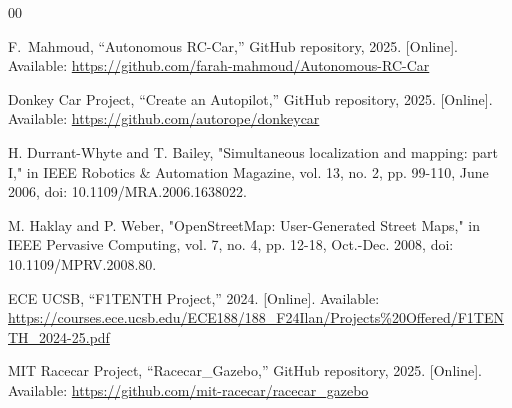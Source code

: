 \documentclass[journal,transmag]{IEEEtran}
\begin{document}
\begin{thebibliography}{00}

F.~Mahmoud, ``Autonomous RC-Car,'' GitHub repository, 2025. [Online]. Available: \url{https://github.com/farah-mahmoud/Autonomous-RC-Car}

Donkey Car Project, ``Create an Autopilot,'' GitHub repository, 2025. [Online]. Available: \url{https://github.com/autorope/donkeycar}

H. Durrant-Whyte and T. Bailey, "Simultaneous localization and mapping: part I," in IEEE Robotics \& Automation Magazine, vol. 13, no. 2, pp. 99-110, June 2006, doi: 10.1109/MRA.2006.1638022.

M. Haklay and P. Weber, "OpenStreetMap: User-Generated Street Maps," in IEEE Pervasive Computing, vol. 7, no. 4, pp. 12-18, Oct.-Dec. 2008, doi: 10.1109/MPRV.2008.80.

ECE UCSB, ``F1TENTH Project,'' 2024. [Online]. Available: \url{https://courses.ece.ucsb.edu/ECE188/188_F24Ilan/Projects%20Offered/F1TENTH_2024-25.pdf}

MIT Racecar Project, ``Racecar\_Gazebo,'' GitHub repository, 2025. [Online]. Available: \url{https://github.com/mit-racecar/racecar_gazebo}










\end{thebibliography}
\appendix
\end{document}
